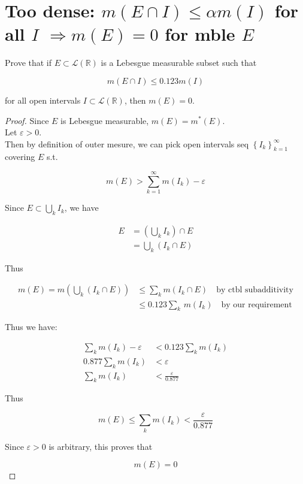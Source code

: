 \section{\texorpdfstring{Too dense: \(m(E \cap I) \leq \alpha m(I)\) for all \(I\) \(\Longrightarrow m(E) = 0\) for mble \(E\)}{Too dense: m(E \textbackslash cap I) \textbackslash leq \textbackslash alpha m(I) for all I \textbackslash Longrightarrow m(E) = 0 for mble E}}\label{too-dense-mecap-ile-alpha-mi-for-all-i-implies-me0-for-mble-e}

Prove that if \(E \subset \mathcal{L}(\mathbb{R})\) is a Lebesgue measurable subset such that

\[m(E \cap I) \leq 0.123m(I)\]

for all open intervals \(I \subset \mathcal{L}(\mathbb{R})\), then \(m(E) = 0\).

\begin{proof}

Since \(E\) is Lebesgue measurable, \(m(E) = m^{\ast}(E)\).\\
Let \(\varepsilon > 0\).\\
Then by definition of outer mesure, we can pick open intervals seq \(\left\{ I_{k} \right\}_{k = 1}^{\infty}\) covering \(E\) s.t.

\[m(E) > \sum\limits_{k = 1}^{\infty}m(I_{k}) - \varepsilon\]

Since \(E \subset \bigcup_{k}I_{k}\), we have

\[\begin{matrix}
E & {= (\bigcup\limits_{k}I_{k}) \cap E} \\
 & {= \bigcup\limits_{k}(I_{k} \cap E)}
\end{matrix}\]

Thus

\[\begin{matrix}
{m(E) = m(\bigcup\limits_{k}(I_{k} \cap E))} & {\leq \sum\limits_{k}m(I_{k} \cap E)\quad\text{by ctbl subadditivity}} \\
 & {\leq 0.123\sum\limits_{k}\, m(I_{k})\quad\text{by our requirement}}
\end{matrix}\]

Thus we have:

\[\begin{matrix}
{\sum\limits_{k}m(I_{k}) - \varepsilon} & {< 0.123\sum\limits_{k}m(I_{k})} \\
{0.877\sum\limits_{k}m(I_{k})} & {< \varepsilon} \\
{\sum\limits_{k}m(I_{k})} & {< \frac{\varepsilon}{0.877}}
\end{matrix}\]

Thus

\[m(E) \leq \sum\limits_{k}m(I_{k}) < \frac{\varepsilon}{0.877}\]

Since \(\varepsilon > 0\) is arbitrary, this proves that

\[m(E) = 0\]

\end{proof}

